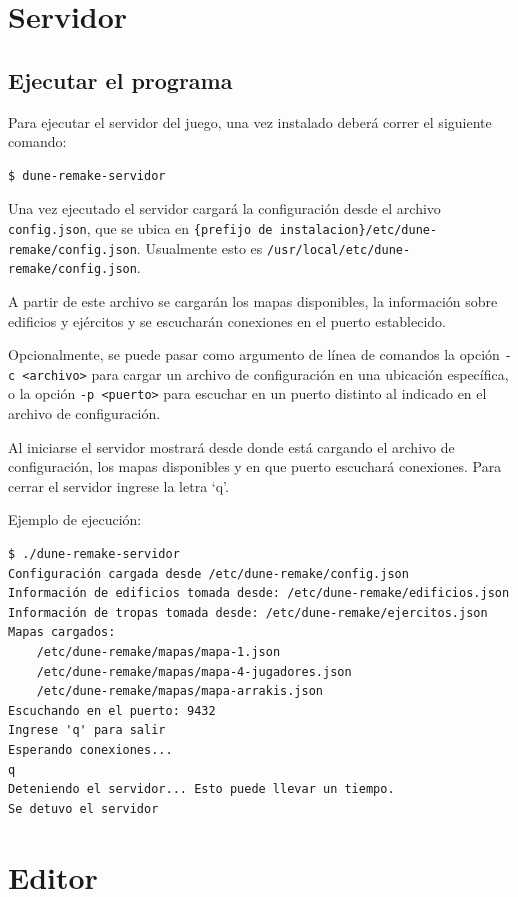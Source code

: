 \documentclass[titlepage,a4paper,12pt]{article}
\begin{document}
\newpage
\section{Servidor}

\subsection{Ejecutar el programa}

Para ejecutar el servidor del juego, una vez instalado deberá correr el siguiente comando:
\begin{verbatim}
$ dune-remake-servidor
\end{verbatim}

Una vez ejecutado el servidor cargará la configuración desde el archivo \texttt{config.json}, que se ubica en \texttt{\{prefijo de instalacion\}/etc/dune-remake/config.json}. Usualmente esto es \texttt{/usr/local/etc/dune-remake/config.json}.

A partir de este archivo se cargarán los mapas disponibles, la información sobre edificios y ejércitos y se escucharán conexiones en el puerto establecido.

Opcionalmente, se puede pasar como argumento de línea de comandos la opción \texttt{-c <archivo>} para cargar un archivo de configuración en una ubicación específica, o la opción \texttt{-p <puerto>} para escuchar en un puerto distinto al indicado en el archivo de configuración.

Al iniciarse el servidor mostrará desde donde está cargando el archivo de configuración, los mapas disponibles y en que puerto escuchará conexiones. Para cerrar el servidor ingrese la letra `q'.

Ejemplo de ejecución:
\begin{verbatim}
$ ./dune-remake-servidor
Configuración cargada desde /etc/dune-remake/config.json
Información de edificios tomada desde: /etc/dune-remake/edificios.json
Información de tropas tomada desde: /etc/dune-remake/ejercitos.json
Mapas cargados: 
	/etc/dune-remake/mapas/mapa-1.json
	/etc/dune-remake/mapas/mapa-4-jugadores.json
	/etc/dune-remake/mapas/mapa-arrakis.json
Escuchando en el puerto: 9432
Ingrese 'q' para salir
Esperando conexiones...
q
Deteniendo el servidor... Esto puede llevar un tiempo.
Se detuvo el servidor
\end{verbatim}


\newpage
\section{Editor}
\end{document}
